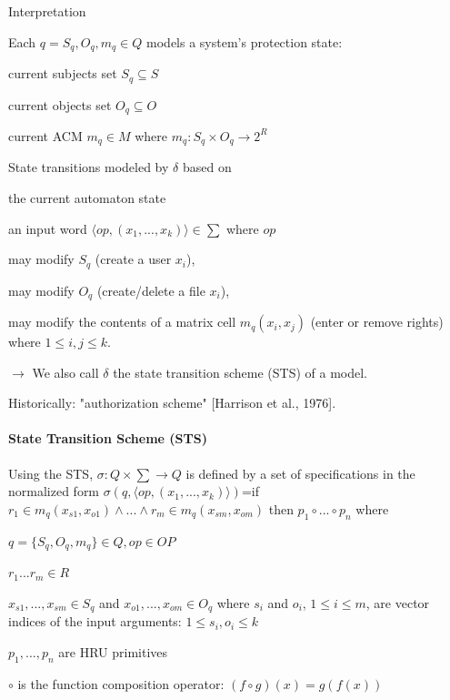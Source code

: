 \documentclass[a4paper]{article}
\begin{document}
\begin{multicols}{3}
    Interpretation
    \begin{itemize*}
        \item Each $q=S_q,O_q,m_q\in Q$ models a system’s protection state:
        \begin{itemize*}
            \item current subjects set $S_q\subseteq S$
            \item current objects set $O_q\subseteq O$
            \item current ACM $m_q\in M$ where $m_q:S_q\times O_q\rightarrow 2^R$
        \end{itemize*}
        \item State transitions modeled by $\delta$ based on
        \begin{itemize*}
            \item the current automaton state
            \item an input word $\langle op,(x_1,...,x_k)\rangle \in\sum$ where $op$
            \item may modify $S_q$ (create a user $x_i$),
            \item may modify $O_q$ (create/delete a file $x_i$),
            \item may modify the contents of a matrix cell $m_q(x_i,x_j)$ (enter or remove rights) where $1\leq i,j\leq k$.
            \item $\rightarrow$  We also call $\delta$ the state transition scheme (STS) of a model.
            \item Historically: "authorization scheme" [Harrison et al., 1976].
        \end{itemize*}
    \end{itemize*}

    \paragraph{State Transition Scheme (STS)}
    Using the STS, $\sigma:Q\times\sum\rightarrow Q$ is defined by a set of specifications in the normalized form
    $\sigma(q,\langle op,(x_1,...,x_k)\rangle )$=if $r_1\in m_q(x_{s1},x_{o1}) \wedge ... \wedge r_m\in m_q(x_{sm},x_{om})$ then $p_1\circ ...\circ p_n$ where
    \begin{itemize*}
        \item $q=\{S_q,O_q,m_q\}\in Q,op\in OP$
        \item $r_1 ...r_m\in R$
        \item $x_{s1},...,x_{sm}\in S_q$ and $x_{o1},...,x_{om}\in O_q$ where $s_i$ and $o_i$, $1\leq i\leq m$, are vector indices of the input arguments: $1\leq s_i,o_i\leq k$
        \item $p_1,...,p_n$ are HRU primitives
        \item $\circ$ is the function composition operator: $(f\circ g)(x)=g(f(x))$
    \end{itemize*}


\end{multicols}
\end{document}
